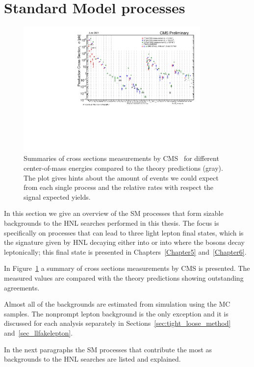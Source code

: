 \section{Standard Model processes}\label{sec:c4sm}
\begin{figure}[h]
\centering
  \includegraphics[width=0.85\textwidth]{Figures/c4/SigmaNew_v0.pdf}
  \caption{Summaries of cross sections measurements by CMS~\cite{cmspublic} for
    different center-of-mass energies compared to the theory
    predictions (gray). The plot gives hints about the
    amount of events we could expect from each single process and the
    relative rates with respect the signal expected yields.}
  \label{fig:crosssection}
\end{figure}
In this section we give an overview of the SM processes that form
sizable backgrounds to the HNL searches performed in this thesis. The
focus is specifically on processes that can lead to three light
lepton final states, which is the
signature given by HNL decaying either into \PZ or into \PW where the bosons
decay leptonically; this final state is presented in
Chapters~\ref{Chapter5} and~\ref{Chapter6}.

In Figure~\ref{fig:crosssection} a summary of cross sections
measurements by CMS is presented. The measured values are compared
with the theory predictions showing outstanding agreements.

Almost all of the backgrounds are estimated from simulation using the
MC samples. The nonprompt lepton background is the only exception and it is
discussed for each analysis separately in Sections~\ref{sec:tight_loose_method}
and~\ref{sec_llfakelepton}. 

In the next paragraphs the SM processes that contribute the most as 
backgrounds to the HNL searches are listed and explained.

